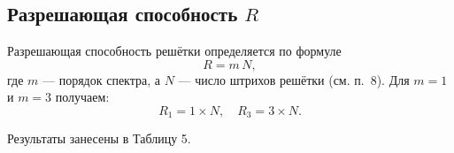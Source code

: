 \subsection{Разрешающая способность \(R\)}

Разрешающая способность решётки определяется по формуле
\[
	R = m\,N,
\]
где \(m\) — порядок спектра, а \(N\) — число штрихов решётки (см. п.~8).
Для \(m=1\) и \(m=3\) получаем:
\[
	R_1 = 1 \times N,\quad R_3 = 3 \times N.
\]

Результаты занесены в Таблицу 5.
